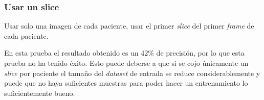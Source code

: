 \documentclass{beamer}
\begin{document}
\begin{frame}
\frametitle{Usar un slice}

Usar solo una imagen de cada paciente, usar el primer \textit{slice} del primer \textit{frame} de cada paciente.

\begin{table}[H]
\centering
{}
\caption{Resultado usar un \textit{slice} por paciente.}
\end{table}

En esta prueba el resultado obtenido es un 42\% de precisión, por lo que esta prueba no ha tenido éxito. Esto puede deberse a que si se cojo únicamente un \textit{slice} por paciente el tamaño del \textit{dataset} de entrada se reduce considerablemente y puede que no haya suficientes muestras para poder hacer un entrenamiento lo suficientemente bueno.

\end{frame}
\end{document}
